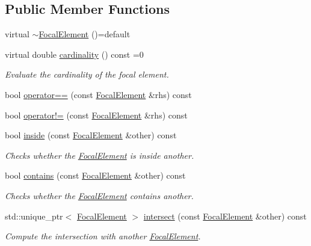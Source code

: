 \subsection*{Public Member Functions}
\begin{DoxyCompactItemize}
\item 
virtual \hyperlink{classFocalElement_a782f3f830a5cfa7242d519b8be3b4346}{$\sim$\+Focal\+Element} ()=default
\item 
virtual double \hyperlink{classFocalElement_a4ab1bbd0875e6e7ce2d7fe152e6a1639}{cardinality} () const =0
\begin{DoxyCompactList}\small\item\em Evaluate the cardinality of the focal element. \end{DoxyCompactList}\item 
bool \hyperlink{classFocalElement_a5bb5efd8bcd128ba471f6b31aaa43865}{operator==} (const \hyperlink{classFocalElement}{Focal\+Element} \&rhs) const 
\item 
bool \hyperlink{classFocalElement_a9071b764cf8860010a0adf4655743c6e}{operator!=} (const \hyperlink{classFocalElement}{Focal\+Element} \&rhs) const 
\item 
bool \hyperlink{classFocalElement_aa1487ed49e7d203636edc8237322ed8b}{inside} (const \hyperlink{classFocalElement}{Focal\+Element} \&other) const 
\begin{DoxyCompactList}\small\item\em Checks whether the \hyperlink{classFocalElement}{Focal\+Element} is inside another. \end{DoxyCompactList}\item 
bool \hyperlink{classFocalElement_acd424124e2ecff4b8c959d4874b89739}{contains} (const \hyperlink{classFocalElement}{Focal\+Element} \&other) const 
\begin{DoxyCompactList}\small\item\em Checks whether the \hyperlink{classFocalElement}{Focal\+Element} contains another. \end{DoxyCompactList}\item 
std\+::unique\+\_\+ptr$<$ \hyperlink{classFocalElement}{Focal\+Element} $>$ \hyperlink{classFocalElement_a2bb276626cceeca8f8ca46eafc923a04}{intersect} (const \hyperlink{classFocalElement}{Focal\+Element} \&other) const 
\begin{DoxyCompactList}\small\item\em Compute the intersection with another \hyperlink{classFocalElement}{Focal\+Element}. \end{DoxyCompactList}\item 

\end{DoxyCompactItemize}

